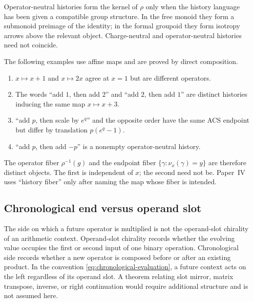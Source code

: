 Operator-neutral histories form the kernel of $\rho$ only when the history
language has been given a compatible group structure.  In the free monoid they
form a submonoid preimage of the identity; in the formal groupoid they form
isotropy arrows above the relevant object.  Charge-neutral and
operator-neutral histories need not coincide.

\begin{example}
The following examples use affine maps and are proved by direct composition.
\begin{enumerate}
  \item $x\mapsto x+1$ and $x\mapsto2x$ agree at $x=1$ but are different
  operators.
  \item The words ``add $1$, then add $2$'' and ``add $2$, then add $1$'' are
  distinct histories inducing the same map $x\mapsto x+3$.
  \item ``add $p$, then scale by $e^q$'' and the opposite order have the same
  ACS endpoint but differ by translation $p(e^q-1)$.
  \item ``add $p$, then add $-p$'' is a nonempty operator-neutral history.
\end{enumerate}
\end{example}

The operator fiber $\rho^{-1}(g)$ and the endpoint fiber
$\{\gamma:\nu_x(\gamma)=y\}$ are therefore distinct objects.  The first is
independent of $x$; the second need not be.  Paper~IV uses ``history fiber''
only after naming the map whose fiber is intended.

\subsection{Chronological end versus operand slot}

The side on which a future operator is multiplied is not the operand-slot
chirality of an arithmetic context.  Operand-slot chirality records whether
the evolving value occupies the first or second input of one binary operation.
Chronological side records whether a new operator is composed before or after
an existing product.  In the convention \eqref{eq:chronological-evaluation}, a
future context acts on the left regardless of its operand slot.  A theorem
relating slot mirror, matrix transpose, inverse, or right continuation would
require additional structure and is not assumed here.
